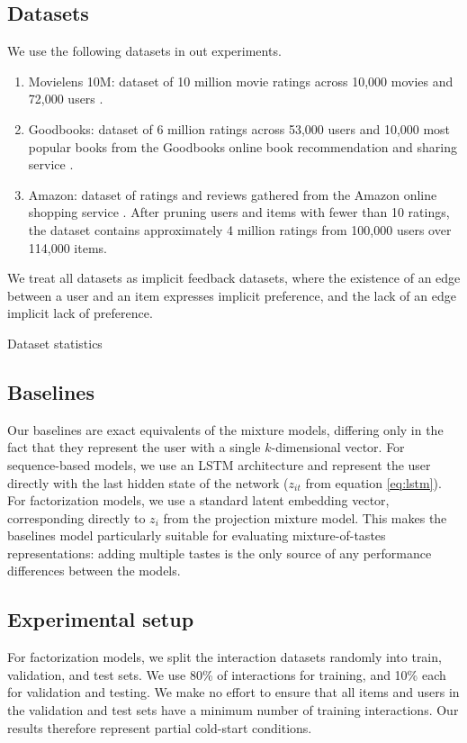 \documentclass[sigconf]{acmart}
\begin{document}
\subsection{Datasets}
We use the following datasets in out experiments.

\begin{enumerate}
\item Movielens 10M: dataset of 10 million movie ratings across 10,000 movies and 72,000 users \citep{harper2016movielens}.
\item Goodbooks: dataset of 6 million ratings across 53,000 users and 10,000 most popular books from the Goodbooks online book recommendation and sharing service \citep{goodbooks2017}.
\item Amazon: dataset of ratings and reviews gathered from the Amazon online shopping service \citep{leskovec2007dynamics}. After pruning users and items with fewer than 10 ratings, the dataset contains approximately 4 million ratings from 100,000 users over 114,000 items.
\end{enumerate}

We treat all datasets as implicit feedback datasets, where the existence of an edge between a user and an item expresses implicit preference, and the lack of an edge implicit lack of preference.

\begin{table}
  \caption{Dataset statistics}
  \label{tab:datasets}
  
\end{table}

\subsection{Baselines}
Our baselines are exact equivalents of the mixture models, differing only in the fact that they represent the user with a single $k$-dimensional vector. For sequence-based models, we use an LSTM architecture and represent the user directly with the last hidden state of the network ($z_{it}$ from equation \ref{eq:lstm}). For factorization models, we use a standard latent embedding vector, corresponding directly to $z_i$ from the projection mixture model. This makes the baselines model particularly suitable for evaluating mixture-of-tastes representations: adding multiple tastes is the only source of any performance differences between the models.


\subsection{Experimental setup}
For factorization models, we split the interaction datasets randomly into train, validation, and test sets. We use 80\% of interactions for training, and 10\% each for validation and testing. We make no effort to ensure that all items and users in the validation and test sets have a minimum number of training interactions. Our results therefore represent partial cold-start conditions.
\end{document}
